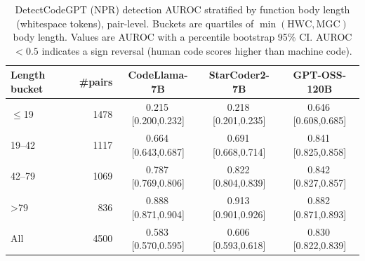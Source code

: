 \begin{table}[t]
\centering
\caption{DetectCodeGPT (NPR) detection AUROC stratified by function body length (whitespace tokens), pair-level. Buckets are quartiles of $\min(\text{HWC},\text{MGC})$ body length. Values are AUROC with a percentile bootstrap 95\% CI. AUROC $<0.5$ indicates a sign reversal (human code scores higher than machine code).}
\label{tab:auroc-by-length}
\begin{tabular}{lrccc}
\toprule
Length bucket & \#pairs & CodeLlama-7B & StarCoder2-7B & GPT-OSS-120B \\
\midrule
$\leq$19 & 1478 & 0.215\,\tiny[0.200,0.232] & 0.218\,\tiny[0.201,0.235] & 0.646\,\tiny[0.608,0.685] \\
19--42 & 1117 & 0.664\,\tiny[0.643,0.687] & 0.691\,\tiny[0.668,0.714] & 0.841\,\tiny[0.825,0.858] \\
42--79 & 1069 & 0.787\,\tiny[0.769,0.806] & 0.822\,\tiny[0.804,0.839] & 0.842\,\tiny[0.827,0.857] \\
>79 & 836 & 0.888\,\tiny[0.871,0.904] & 0.913\,\tiny[0.901,0.926] & 0.882\,\tiny[0.871,0.893] \\
\midrule
All & 4500 & 0.583\,\tiny[0.570,0.595] & 0.606\,\tiny[0.593,0.618] & 0.830\,\tiny[0.822,0.839] \\
\bottomrule
\end{tabular}
\end{table}
